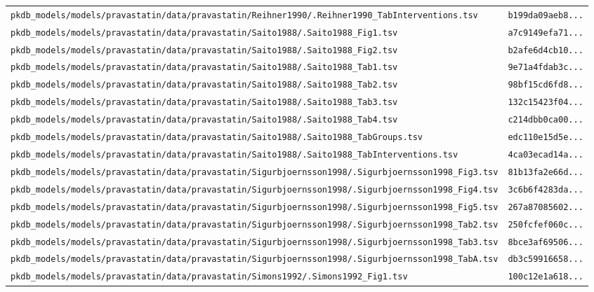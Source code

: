\begin{longtable}{ll}
\texttt{pkdb\_models/models/pravastatin/data/pravastatin/Reihner1990/.Reihner1990\_TabInterventions.tsv} & \texttt{b199da09aeb8...} \\
\texttt{pkdb\_models/models/pravastatin/data/pravastatin/Saito1988/.Saito1988\_Fig1.tsv} & \texttt{a7c9149efa71...} \\
\texttt{pkdb\_models/models/pravastatin/data/pravastatin/Saito1988/.Saito1988\_Fig2.tsv} & \texttt{b2afe6d4cb10...} \\
\texttt{pkdb\_models/models/pravastatin/data/pravastatin/Saito1988/.Saito1988\_Tab1.tsv} & \texttt{9e71a4fdab3c...} \\
\texttt{pkdb\_models/models/pravastatin/data/pravastatin/Saito1988/.Saito1988\_Tab2.tsv} & \texttt{98bf15cd6fd8...} \\
\texttt{pkdb\_models/models/pravastatin/data/pravastatin/Saito1988/.Saito1988\_Tab3.tsv} & \texttt{132c15423f04...} \\
\texttt{pkdb\_models/models/pravastatin/data/pravastatin/Saito1988/.Saito1988\_Tab4.tsv} & \texttt{c214dbb0ca00...} \\
\texttt{pkdb\_models/models/pravastatin/data/pravastatin/Saito1988/.Saito1988\_TabGroups.tsv} & \texttt{edc110e15d5e...} \\
\texttt{pkdb\_models/models/pravastatin/data/pravastatin/Saito1988/.Saito1988\_TabInterventions.tsv} & \texttt{4ca03ecad14a...} \\
\texttt{pkdb\_models/models/pravastatin/data/pravastatin/Sigurbjoernsson1998/.Sigurbjoernsson1998\_Fig3.tsv} & \texttt{81b13fa2e66d...} \\
\texttt{pkdb\_models/models/pravastatin/data/pravastatin/Sigurbjoernsson1998/.Sigurbjoernsson1998\_Fig4.tsv} & \texttt{3c6b6f4283da...} \\
\texttt{pkdb\_models/models/pravastatin/data/pravastatin/Sigurbjoernsson1998/.Sigurbjoernsson1998\_Fig5.tsv} & \texttt{267a87085602...} \\
\texttt{pkdb\_models/models/pravastatin/data/pravastatin/Sigurbjoernsson1998/.Sigurbjoernsson1998\_Tab2.tsv} & \texttt{250fcfef060c...} \\
\texttt{pkdb\_models/models/pravastatin/data/pravastatin/Sigurbjoernsson1998/.Sigurbjoernsson1998\_Tab3.tsv} & \texttt{8bce3af69506...} \\
\texttt{pkdb\_models/models/pravastatin/data/pravastatin/Sigurbjoernsson1998/.Sigurbjoernsson1998\_TabA.tsv} & \texttt{db3c59916658...} \\
\texttt{pkdb\_models/models/pravastatin/data/pravastatin/Simons1992/.Simons1992\_Fig1.tsv} & \texttt{100c12e1a618...} \\

\end{longtable}
